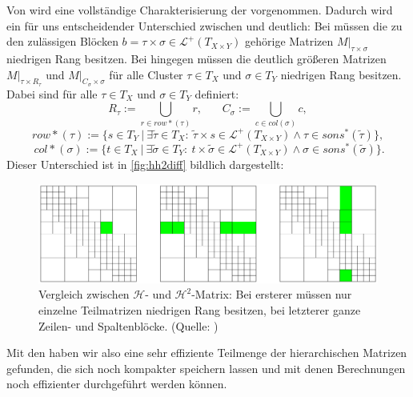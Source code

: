       Von \citet{datasparse} wird eine vollständige Charakterisierung der \hquad vorgenommen. Dadurch wird ein für uns entscheidender Unterschied zwischen \hmat und \hquad deutlich:
      Bei \hmat müssen die zu den zulässigen Blöcken $b =\tau \times \sigma \in \mathcal{L}^+\left(T_{X \times Y}\right)$ gehörige Matrizen $\left. M\right|_{\tau \times \sigma}$ niedrigen Rang besitzen.
      Bei \hquad hingegen müssen die deutlich größeren Matrizen $\left. M\right|_{\tau \times R_\tau}$ und $\left. M\right|_{C_\sigma \times \sigma}$ für alle Cluster $\tau \in T_X$ und $\sigma\in T_Y$
      niedrigen Rang besitzen. Dabei sind für alle $\tau \in T_X$ und $\sigma \in T_Y$ definiert:
      \[
	R_\tau := \bigcup_{r \in row*(\tau)} r , \ \ \ \ \ \ \ \ C_\sigma := \bigcup_{c \in col(\sigma)} c,
      \]
      \[
       row*(\tau) := \{ s \in T_Y \ | \ \exists \tilde \tau \in T_X \colon \ \tilde \tau \times s \in \mathcal{L}^+\left(T_{X \times Y}\right) \wedge \tau \in sons^*(\tilde \tau) \},
      \]
      \[
       \ col*(\sigma) := \{ t \in T_X \ | \ \exists \tilde \sigma \in T_Y \colon \ t \times \tilde \sigma \in \mathcal{L}^+\left(T_{X \times Y}\right) \wedge \sigma \in sons^*(\tilde \sigma) \}.
      \]
      Dieser Unterschied ist in \autoref{fig:hh2diff} bildlich dargestellt:
      
      \begin{figure}[b]
	\includegraphics[width=\textwidth]{img/H_H2_diff.png}
	\caption{Vergleich zwischen $\mathcal{H}$- und $\mathcal{H}^2$-Matrix: Bei ersterer müssen nur einzelne Teilmatrizen niedrigen Rang besitzen, bei letzterer ganze Zeilen- und Spaltenblöcke.
	(Quelle: \citet{nichtlokop})}
	\label{fig:hh2diff}
      \end{figure}


      Mit den \hquad haben wir also eine sehr effiziente Teilmenge der hierarchischen Matrizen gefunden, die sich noch kompakter speichern lassen und mit denen Berechnungen noch effizienter 
      durchgeführt werden können.